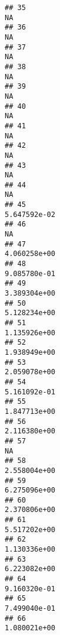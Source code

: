 \documentclass[
]{article}
\begin{document}
\begin{verbatim}
## 35                                                                          NA
## 36                                                                          NA
## 37                                                                          NA
## 38                                                                          NA
## 39                                                                          NA
## 40                                                                          NA
## 41                                                                          NA
## 42                                                                          NA
## 43                                                                          NA
## 44                                                                          NA
## 45                                                                5.647592e-02
## 46                                                                          NA
## 47                                                                4.060258e+00
## 48                                                                9.085780e-01
## 49                                                                3.389304e+00
## 50                                                                5.128234e+00
## 51                                                                1.135926e+00
## 52                                                                1.938949e+00
## 53                                                                2.059078e+00
## 54                                                                5.161092e-01
## 55                                                                1.847713e+00
## 56                                                                2.116380e+00
## 57                                                                          NA
## 58                                                                2.558004e+00
## 59                                                                6.275096e+00
## 60                                                                2.370806e+00
## 61                                                                5.517202e+00
## 62                                                                1.130336e+00
## 63                                                                6.223082e+00
## 64                                                                9.160320e-01
## 65                                                                7.499040e-01
## 66                                                                1.080021e+00

\end{verbatim}
\end{document}
